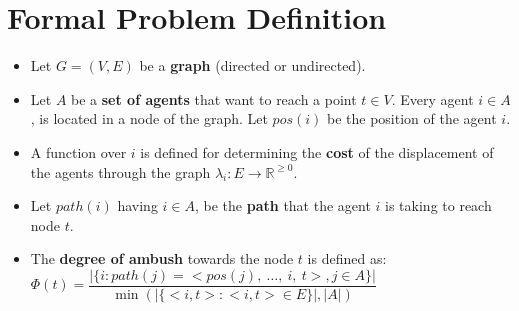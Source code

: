 \begin{minipage}{0.3\textwidth}

\section*{Formal Problem Definition}
\begin{itemize}
\item Let $G = (V,E)$ be a \textbf{graph} (directed or undirected).

\item Let $A$ be a \textbf{set of agents} that want to reach a point
$t \in V$. Every agent $i \in A$, is located in a node of the
graph. Let $pos(i)$ be the position of the agent $i$.

\item A function over $i$ is defined for  determining the
\textbf{cost} of the displacement of the agents  through the graph
$\lambda_i : E \longrightarrow \mathbb{R}^{\geq 0}$.

\item Let $path(i)$ having $i \in A$, be the \textbf{path} that the 
agent $i$ is taking to reach node $t$.

\item The \textbf{degree of ambush} towards the node $t$ is defined as:\\

$\Phi(t) = \dfrac{|\{ i : path(j) = <pos(j),\ \ldots,\ i,\ t>, j \in A\}|}
{\min(|\{ <i,t> : <i,t> \in E \} |,|A|) }$

\end{itemize}
\end{minipage}